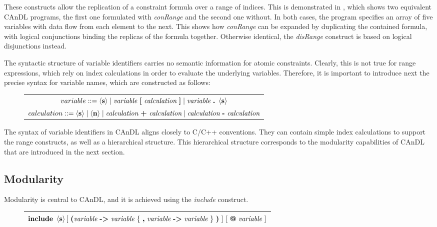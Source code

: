     \noindent
    These constructs allow the replication of a constraint formula over a range
    of indices.
    This is demonstrated in , which shows two equivalent
    CAnDL programs, the first one formulated with {\it conRange} and the
    second one without.
    In both cases, the program specifies an array of five variables with data
    flow from each element to the next.
    This shows how {\it conRange} can be expanded by duplicating the contained
    formula, with logical conjunctions binding the replicas of the
    formula together.
    Otherwise identical, the {\it disRange} construct is based on logical
    disjunctions instead.

    The syntactic structure of variable identifiers carries no semantic
    information for atomic constraints.
    Clearly, this is not true for range expressions, which rely on index
    calculations in order to evaluate the underlying variables.
    Therefore, it is important to introduce next the precise syntax for variable
    names, which are constructed as follows:

\begin{figure}[h]
  \centering
  \begin{tabular}{|c|}
    \hline
    $variable ::= \left<\text{\bf s}\right>\mid\text{\it variable}\ \text{\bf [}\ \text{\it calculation}\ \text{\bf ]}\mid\text{\it variable}\ \text{\bf.}\ \left<\text{\bf s}\right>$\\
    $calculation ::= \left<\text{\bf s}\right>\mid\left<\text{\bf n}\right>\mid\text{\it calculation}\ \text{\bf+}\ \text{\it calculation}\mid\text{\it calculation}\ \text{\bf-}\ \text{\it calculation}$\\
    \hline
  \end{tabular}
\end{figure}

    \noindent
    The syntax of variable identifiers in CAnDL aligns closely to C/C++
    conventions.
    They can contain simple index calculations to support the range constructs,
    as well as a hierarchical structure.
    This hierarchical structure corresponds to the modularity capabilities of
    CAnDL that are introduced in the next section.

\subsection{Modularity}

    Modularity is central to CAnDL, and it is achieved using the {\it include}
    construct.
    \begin{figure}[h]
        \centering
        \begin{tabular}{|c|}
            \hline
            $\text{\bf include}\ \left<\text{\bf s}\right>
                                [\ \text{\bf (}\text{\it variable}\ \text{\bf ->}\ \text{\it variable}\ \{\ \text{\bf ,}\ \text{\it variable}\ \text{\bf ->}\ \text{\it variable}\ \}\ \text{\bf )}\ ]\ 
                                [\ \text{\bf @}\ \text{\it variable}\ ]$\\
            \hline
        \end{tabular}
    \end{figure}

